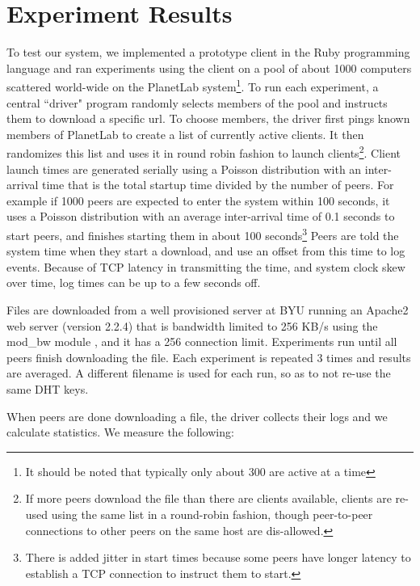 
\chapter{Experiment Results}

To test our system, we implemented a prototype client in the Ruby programming language and 
ran experiments using the client on a pool of about 1000 computers scattered world-wide on the PlanetLab system\footnote{It should be noted
that typically only about 300 are active at a time}.
To run each experiment, a central ``driver" program randomly selects members of the pool and instructs them to download a specific url.  To
choose members, the driver first pings known members of PlanetLab to create a list of currently active clients.  
It then randomizes this list and uses it in round robin fashion to launch clients\footnote{If more peers download the file than there are clients available, clients are re-used using the same list in a round-robin fashion, though peer-to-peer connections 
to other peers on the same host are dis-allowed.}. 
Client launch times are generated serially using a Poisson distribution with an inter-arrival time that is the total startup time
divided by the number of peers.  For example if 1000 peers are expected to enter the system within 100 seconds, it uses a Poisson distribution with 
an average inter-arrival time of 0.1 seconds to start peers, and finishes
starting them in about 100 seconds\footnote{There is added jitter in start times because some peers have longer latency to establish a TCP connection
to instruct them to start.}  Peers are told the system time when they start a download, 
and use an offset from this time to log events.  Because of TCP latency in transmitting the time, and system clock skew over time, 
log times can be up to a few seconds off.

Files are downloaded from a well provisioned server at BYU running an Apache2 web server (version 2.2.4) that is
bandwidth limited to 256 KB/s using the mod\_bw module \cite{mod_bw}, and it has a 256 connection limit. 
Experiments run until all peers finish downloading the file. 
Each experiment is repeated 3 times and results are averaged.  A different filename is used for each run, so as to not re-use the same DHT keys.

When peers are done downloading a file, the driver collects their logs and we calculate statistics.  We measure 
the following:

